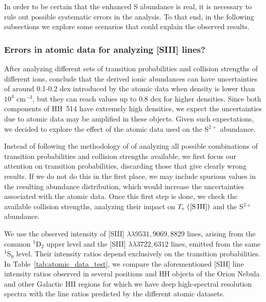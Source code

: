 \documentclass[fleqn,usenatbib]{mnras}
\begin{document}
In order to be certain that the enhanced S abundance is real,
it is necessary to rule out possible systematic errors in the analysis.
To that end, in the following subsections we explore some scenarios that could explain the observed results.

\subsubsection{Errors in atomic data for analyzing [S\thinspace III] lines?}
\label{subsec:atomic_data}

After analyzing different sets of transition probabilities and collision strengths of different ions, \citet{Juan-de-Dios17} conclude that the derived ionic abundances can have uncertainties of around 0.1-0.2 dex introduced by the atomic data when density is lower than $10^4$ cm$^{-3}$, but they can reach values up to 0.8 dex for higher densities. Since both components of HH~514 have extremely high densities, we expect the uncertainties due to atomic data may be amplified in these objects. Given such expectations, we decided to explore the effect of the atomic data used on the S$^{2+}$ abundance.

Instead of following the methodology of  \citet{Juan-de-Dios17} of analyzing all possible combinations of transition probabilities and collision strengths available, we first focus our attention on transition probabilities, discarding those that give clearly wrong results. If we do not do this in the first place, we may include spurious values in the resulting abundance distribution, which would increase the uncertainties associated with the atomic data. Once this first step is done, we  check the available collision strengths, analyzing their impact on $T_{\rm e} \text{ ([S\thinspace III])}$ and the S$^{2+}$ abundance.


We use the observed intensity of [S\thinspace III] $\lambda \lambda 9531, 9069, 8829$ lines, arising from the common $^1$D$_2$ upper level and the [S\thinspace III] $\lambda \lambda 3722, 6312$ lines, emitted from the same $^1$S$_0$ level. Their intensity ratios depend exclusively on the transition probabilities. In Table~\ref{tab:atomic_data_test}, we compare the aforementioned [S\thinspace III] line intensity ratios observed in several positions and HH objects of the Orion Nebula and other Galactic H\thinspace II regions for which we have deep high-spectral resolution spectra with the line ratios predicted by the different atomic datasets.    
\end{document}
